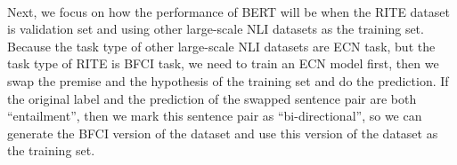 \documentclass[12pt]{article}
\begin{document}
\begin{CJK*}{UTF8}{bkai}
\begin{spacing}{1.77}
\paragraph{}
Next, we focus on how the performance of BERT will be when the RITE dataset is validation set and using other large-scale NLI datasets as the training set. Because the task type of other large-scale NLI datasets are ECN task, but the task type of RITE is BFCI task, we need to train an ECN model first, then we swap the premise and the hypothesis of the training set and do the prediction. If the original label and the prediction of the swapped sentence pair are both ``entailment'', then we mark this sentence pair as ``bi-directional'', so we can generate the BFCI version of the dataset and use this version of the dataset as the training set.


\end{spacing}
\end{CJK*}
\end{document}
